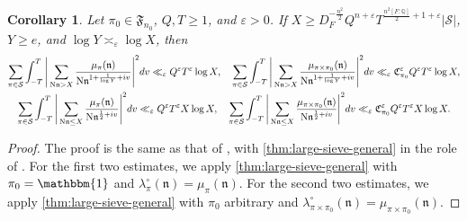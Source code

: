 \documentclass[11pt]{amsart}
\newtheorem{corollary}[theorem]{Corollary}
\theoremstyle{remark}
\numberwithin{equation}{section}
\newcommand{\kn}{\mathfrak{n}}
\newcommand{\N}{\textnormal{N}}
\newcommand{\Q}{\mathbb{Q}}
\renewcommand{\epsilon}{\varepsilon}
\begin{document}
\begin{corollary}
\label{cor:MVT_mu}
	Let $\pi_0\in\mathfrak{F}_{n_0}$, $Q,T\geq 1$, and $\epsilon>0$.  If $X\geq D_F^{-\frac{n^2}{2}}Q^{n+\epsilon}T^{\frac{n^2 [F:\Q]}{2}+1+\epsilon}|\mathcal{S}|$, $Y\geq e$, and $\log Y\asymp_{\epsilon} \log X$, then
	{\small\begin{align*}
    \begin{gathered}
    \sum_{\pi\in\mathcal{S}}\int_{-T}^{T}\Bigg|\sum_{\substack{\N\kn > X}}\frac{\mu_{\pi}(\kn)}{\N\kn^{1+\frac{1}{\log Y}+iv}}\Bigg|^2 dv \ll_{\epsilon} Q^{\epsilon}T^{\epsilon}\log X,\quad \sum_{\pi\in\mathcal{S}}\int_{-T}^{T}\Bigg|\sum_{\substack{\N\kn > X}}\frac{\mu_{\pi\times\pi_0}(\kn)}{\N\kn^{1+\frac{1}{\log Y}+iv}}\Bigg|^2 dv \ll_{\epsilon} \mathfrak{C}_{\pi_0}^{\epsilon}Q^{\epsilon}T^{\epsilon}\log X,\\
	\sum_{\pi\in\mathcal{S}}\int_{-T}^{T}\Bigg|\sum_{\substack{\N\kn\leq X}}\frac{\mu_{\pi}(\kn)}{\N\kn^{\frac{1}{2}+iv}}\Bigg|^2 dv\ll_{\epsilon} Q^{\epsilon}T^{\epsilon}X\log X,\quad 
	\sum_{\pi\in\mathcal{S}}\int_{-T}^{T}\Bigg|\sum_{\substack{\N\kn\leq X}}\frac{\mu_{\pi\times\pi_0}(\kn)}{\N\kn^{\frac{1}{2}+iv}}\Bigg|^2 dv\ll_{\epsilon} \mathfrak{C}_{\pi_0}^{\epsilon}Q^{\epsilon}T^{\epsilon}X\log X.
    \end{gathered}
	\end{align*}}%
\end{corollary}
\begin{proof}
The proof is the same as that of \cite[Corollary 4.4]{humphries2024zeros}, with \cref{thm:large-sieve-general} in the role of \cite[Theorem 4.1]{humphries2024zeros}.  For the first two estimates, we apply \cref{thm:large-sieve-general} with $\pi_0=\mathbbm{1}$ and $\lambda_{\pi}^{\circ}(\kn)=\mu_{\pi}(\kn)$.  For the second two estimates, we apply \cref{thm:large-sieve-general} with $\pi_0$ arbitrary and $\lambda_{\pi\times\pi_0}^{\circ}(\kn)=\mu_{\pi\times\pi_0}(\kn)$.
\end{proof}
\end{document}
